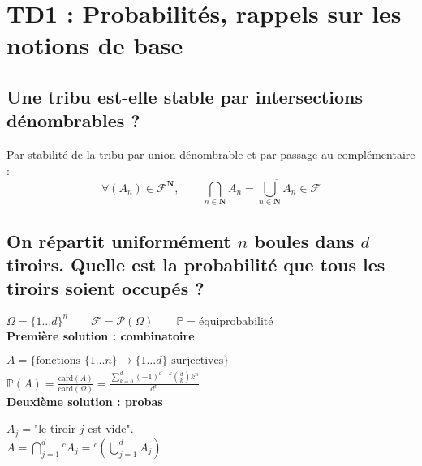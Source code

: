\documentclass[a4paper, 10pt, oneside]{article}
\begin{document}


\newtheorem{theo}{Théorème}
\newtheorem{prop}[theo]{Proposition}
\newtheorem{coro}[theo]{Corollaire}
\newtheorem{lemme}[theo]{Lemme
}
\theoremstyle{definition}
\newtheorem{defi}{Définition}
\newtheorem*{rema}{Remarque}
\newtheorem*{exem}{Exemple}
\newtheorem*{preuve}{Preuve}
\newtheorem*{rappel}{Rappel}
\newtheorem*{appli}{Application}

\section*{TD1 : Probabilités, rappels sur les notions de base}

\subsection{Une tribu est-elle stable par intersections dénombrables ?}

Par stabilité de la tribu par union dénombrable et par passage au complémentaire :
$$
\forall(A_n)\in\mathcal{F}^\mathbf{N},\qquad\bigcap_{n\in\mathbf{N}}A_n=\overline{\bigcup_{n\in\mathbf{N}}\overline{A_n}}\in\mathcal{F} 
$$

\subsection{On répartit uniformément \texorpdfstring{$n$}{TEXT} boules dans \texorpdfstring{$d$}{TEXT} tiroirs. Quelle est la probabilité que tous les tiroirs soient occupés ?}

$\Omega=\{1\ldots d\}^n\qquad \mathcal{F}=\mathcal{P}(\Omega)\qquad\mathbb{P}=\text{équiprobabilité}$\\


\textbf{Première solution : combinatoire}

$A=\{\text{fonctions }\{1\ldots n\}\xrightarrow[]{}\{1\ldots d\}\text{ surjectives}\}$\\

$\mathbb{P}(A)=\frac{\text{card}(A)}{\text{card}(\Omega)}=\frac{\sum_{k=0}^d(-1)^{d-k}{d\choose k} k^n}{d^n}$\\

\textbf{Deuxième solution : probas}

$A_j=$"le tiroir $j$ est vide".\\

$A=\bigcap_{j=1}^d {}^cA_j= {}^c\left(\bigcup_{j=1}^dA_j\right)$\\
\end{document}
